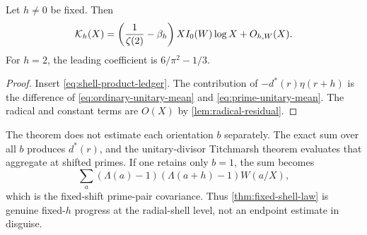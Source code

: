 \begin{theorem}
\label{thm:fixed-shell-law}
Let $h\ne0$ be fixed.  Then
\begin{equation}
 \mathcal K_h(X)=
 \left(\frac1{\zeta(2)}-\beta_h\right)
 XI_0(W)\log X+O_{h,W}(X).
 \label{eq:fixed-shell-law}
\end{equation}
For $h=2$, the leading coefficient is
$6/\pi^2-1/3$.
\end{theorem}

\begin{proof}
Insert \eqref{eq:shell-product-ledger}.  The contribution of
$-d^*(r)\eta(r+h)$ is the difference of
\eqref{eq:ordinary-unitary-mean} and
\eqref{eq:prime-unitary-mean}.  The radical and constant terms are
$O(X)$ by \cref{lem:radical-residual}.
\end{proof}

\begin{remark}
The theorem does not estimate each orientation $b$ separately.  The exact
sum over all $b$ produces $d^*(r)$, and the unitary-divisor Titchmarsh
theorem evaluates that aggregate at shifted primes.  If one retains only
$b=1$, the sum becomes
\[
 \sum_a(\Lambda(a)-1)(\Lambda(a+h)-1)W(a/X),
\]
which is the fixed-shift prime-pair covariance.  Thus
\cref{thm:fixed-shell-law} is genuine fixed-$h$ progress at the radial-shell
level, not an endpoint estimate in disguise.
\end{remark}
